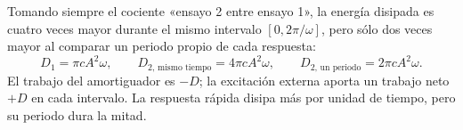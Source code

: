 Tomando siempre el cociente «ensayo 2 entre ensayo 1», la energía disipada es cuatro veces mayor durante el mismo intervalo \([0,2\pi/\omega]\), pero sólo dos veces mayor al comparar un periodo propio de cada respuesta:
\[
D_1=\pi cA^2\omega,\qquad
D_{2,\,\text{mismo tiempo}}=4\pi cA^2\omega,
\qquad D_{2,\,\text{un periodo}}=2\pi cA^2\omega.
\]
El trabajo del amortiguador es \(-D\); la excitación externa aporta un trabajo neto \(+D\) en cada intervalo. La respuesta rápida disipa más por unidad de tiempo, pero su periodo dura la mitad.
